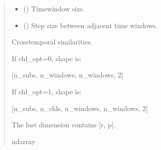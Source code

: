 \documentclass[letterpaper,10pt,english]{sphinxhowto}
\begin{document}
\begin{fulllineitems}
\begin{quote}
\begin{description}
\begin{itemize}
\begin{itemize}
\item {} 
 : calculate similarities separately for each channel

\end{itemize}


\item {} 
\sphinxAtStartPar
{} (\sphinxstyleliteralemphasis{\sphinxupquote{, }}) \textendash{} Time\sphinxhyphen{}window size.

\item {} 
\sphinxAtStartPar
{} (\sphinxstyleliteralemphasis{\sphinxupquote{, }}) \textendash{} Step size between adjacent time windows.

\end{itemize}

\sphinxAtStartPar

\sphinxAtStartPar
{} \textendash{} Cross\sphinxhyphen{}temporal similarities.

\sphinxAtStartPar
If chl\_opt=0, shape is:

\sphinxAtStartPar
{[}n\_subs, n\_windows, n\_windows, 2{]}

\sphinxAtStartPar
If chl\_opt=1, shape is:

\sphinxAtStartPar
{[}n\_subs, n\_chls, n\_windows, n\_windows, 2{]}

\sphinxAtStartPar
The last dimension contains {[}r, p{]}.


\sphinxAtStartPar
ndarray

\end{description}\end{quote}

\end{fulllineitems}

\end{document}
